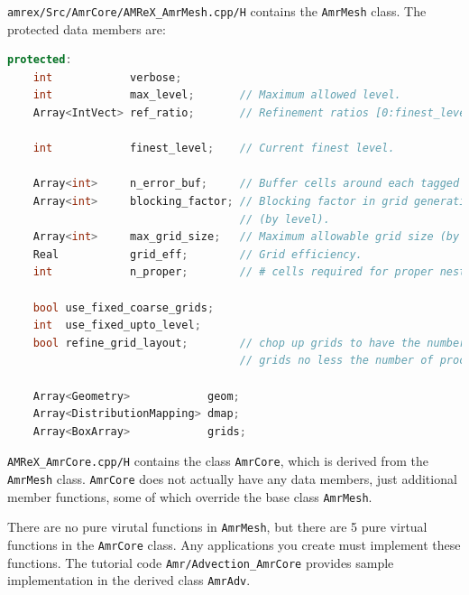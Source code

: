 {\tt amrex/Src/AmrCore/AMReX\_AmrMesh.cpp/H} contains the {\tt AmrMesh} class.
The protected data members are:
\begin{lstlisting}[language=cpp]
protected:
    int            verbose;
    int            max_level;       // Maximum allowed level.
    Array<IntVect> ref_ratio;       // Refinement ratios [0:finest_level-1]

    int            finest_level;    // Current finest level.

    Array<int>     n_error_buf;     // Buffer cells around each tagged cell.
    Array<int>     blocking_factor; // Blocking factor in grid generation 
                                    // (by level).
    Array<int>     max_grid_size;   // Maximum allowable grid size (by level).
    Real           grid_eff;        // Grid efficiency.
    int            n_proper;        // # cells required for proper nesting.

    bool use_fixed_coarse_grids;
    int  use_fixed_upto_level;
    bool refine_grid_layout;        // chop up grids to have the number of 
                                    // grids no less the number of procs

    Array<Geometry>            geom;
    Array<DistributionMapping> dmap;
    Array<BoxArray>            grids;    
\end{lstlisting}

{\tt AMReX\_AmrCore.cpp/H} contains the class {\tt AmrCore}, which is derived from
the {\tt AmrMesh} class.  {\tt AmrCore} does not actually have any data members,
just additional member functions, some of which override the base class {\tt AmrMesh}.

There are no pure virutal functions in {\tt AmrMesh}, but 
there are 5 pure virtual functions in the {\tt AmrCore} class.  Any applications
you create must implement these functions.  The tutorial code 
{\tt Amr/Advection\_AmrCore} provides sample implementation in the derived
class {\tt AmrAdv}.

